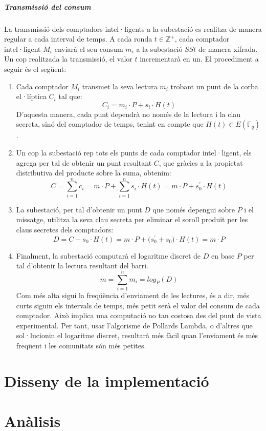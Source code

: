 \documentclass{article}
\begin{document}
\subsubsection{Transmissió del consum}\label{section:ct}
La transmissió dels comptadors intel·ligents a la subestació es realitza de manera regular a cada interval de temps. A cada ronda $t \in \mathbb{Z^+}$, cada comptador intel·ligent $M_i$ enviarà el seu consum $m_i$ a la subestació $SSt$ de manera xifrada. Un cop realitzada la transmissió, el valor $t$ incrementarà en un. El procediment a seguir és el següent:
\begin{enumerate}
	\item Cada comptador $M_i$ transmet la seva lectura $m_i$ trobant un punt de la corba el·líptica $C_i$ tal que:
	\[C_i = m_i \cdot P + s_i \cdot H(t)\]
	D'aquesta manera, cada punt dependrà no només de la lectura i la clau secreta, sinó del comptador de temps, tenint en compte que $H(t) \in E(\mathbb{F}_q)$.
	\item Un cop la subestació rep tots els punts de cada comptador intel·ligent, els agrega per tal de obtenir un punt resultant $C$, que gràcies a la propietat distributiva del producte sobre la suma, obtenim:
	\[C = \sum_{i=1}^{n}c_i = m \cdot P + \sum_{i=1}^{n}s_i \cdot H(t) = m \cdot P + s_0^{'}\cdot H(t)\]
	\item La subestació, per tal d'obtenir un punt $D$ que només depengui sobre $P$ i el missatge, utilitza la seva clau secreta per eliminar el soroll produït per les claus secretes dels comptadors:
	\[D = C + s_0 \cdot H(t) = m \cdot P + \big( s_0^{'} + s_0 \big) \cdot H(t) = m \cdot P\]
	\item Finalment, la subestació computarà el logaritme discret de $D$ en base $P$ per tal d'obtenir la lectura resultant del barri.
	\[m = \sum_{i=1}^{n} m_i = log_P(D)\]
	Com més alta sigui la freqüència d'enviament de les lectures, és a dir, més curts siguin els intervals de temps, més petit serà el valor del consum de cada comptador. Això implica una computació no tan costosa des del punt de vista experimental. Per tant, usar l'algorisme de Pollards Lambda, o d'altres que sol·lucionin el logaritme discret, resultarà més fàcil quan l'enviament és més freqüent i les comunitats són més petites.
\end{enumerate}

\newpage\part{Disseny de la implementació}\label{part:disseny}

\newpage\part{Anàlisis}\label{part:analisis}

\newpage


\end{document}
